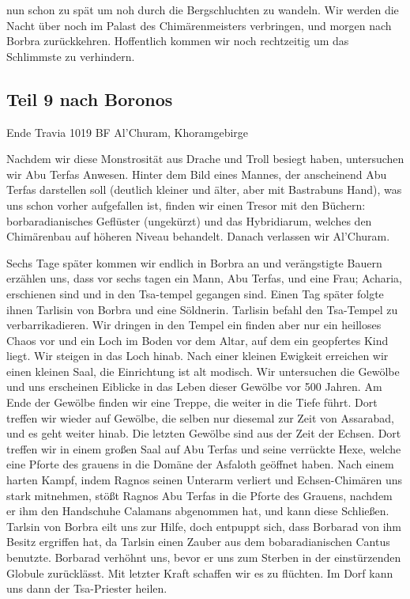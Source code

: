 nun schon zu spät um noh durch die Bergschluchten zu wandeln. Wir werden die Nacht über noch im Palast des Chimärenmeisters verbringen, und morgen nach Borbra zurückkehren. Hoffentlich kommen wir noch rechtzeitig um das Schlimmste zu verhindern.

\subsection{Teil 9 nach Boronos}

Ende Travia 1019 BF Al'Churam, Khoramgebirge

Nachdem wir diese Monstrosität aus Drache und Troll besiegt haben, untersuchen wir Abu Terfas Anwesen. Hinter dem Bild eines Mannes, der anscheinend Abu Terfas darstellen soll (deutlich kleiner und älter, aber mit Bastrabuns Hand), was uns schon vorher aufgefallen ist, finden wir einen Tresor mit den Büchern: borbaradianisches Geflüster (ungekürzt) und das Hybridiarum, welches den Chimärenbau auf höheren Niveau behandelt.
Danach verlassen wir Al'Churam.

Sechs Tage später kommen wir endlich in Borbra an und verängstigte Bauern erzählen uns, dass vor sechs tagen ein Mann, Abu Terfas, und eine Frau; Acharia, erschienen sind und in den Tsa-tempel gegangen sind. Einen Tag später folgte ihnen Tarlisin von Borbra und eine Söldnerin. Tarlisin befahl den Tsa-Tempel zu verbarrikadieren. Wir dringen in den Tempel ein finden aber nur ein heilloses Chaos vor und ein Loch im Boden vor dem Altar, auf dem ein geopfertes Kind liegt. Wir steigen in das Loch hinab.
Nach einer kleinen Ewigkeit erreichen wir einen kleinen Saal, die Einrichtung ist alt modisch. Wir untersuchen die Gewölbe und uns erscheinen Eiblicke in das Leben dieser Gewölbe vor 500 Jahren. Am Ende der Gewölbe finden wir eine Treppe, die weiter in die Tiefe führt. Dort treffen wir wieder auf Gewölbe, die selben nur diesemal zur Zeit von Assarabad, und es geht weiter hinab. Die letzten Gewölbe sind aus der Zeit der Echsen. Dort treffen wir in einem großen Saal auf Abu Terfas und seine verrückte Hexe, welche eine Pforte des grauens in die Domäne der Asfaloth geöffnet haben.
Nach einem harten Kampf, indem Ragnos seinen Unterarm verliert und Echsen-Chimären uns stark mitnehmen, stößt Ragnos Abu Terfas in die Pforte des Grauens, nachdem er ihm den Handschuhe Calamans abgenommen hat, und kann diese Schließen.
Tarlsin von Borbra eilt uns zur Hilfe, doch entpuppt sich, dass Borbarad von ihm Besitz ergriffen hat, da Tarlsin einen Zauber aus dem bobaradianischen Cantus benutzte. Borbarad verhöhnt uns, bevor er uns zum Sterben in der einstürzenden Globule zurücklässt. Mit letzter Kraft schaffen wir es zu flüchten. Im Dorf kann uns dann der Tsa-Priester heilen.
